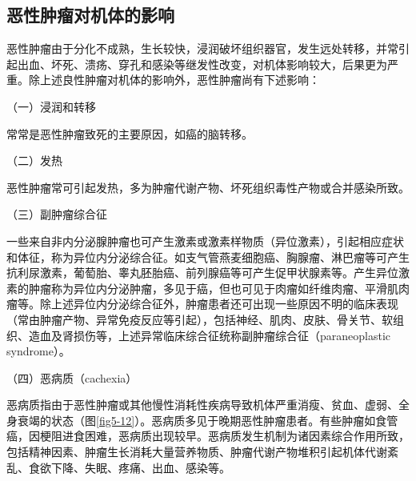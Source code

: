 \subsection{恶性肿瘤对机体的影响}

恶性肿瘤由于分化不成熟，生长较快，浸润破坏组织器官，发生远处转移，并常引起出血、坏死、溃疡、穿孔和感染等继发性改变，对机体影响较大，后果更为严重。除上述良性肿瘤对机体的影响外，恶性肿瘤尚有下述影响：

{（一）浸润和转移}

常常是恶性肿瘤致死的主要原因，如癌的脑转移。

{（二）发热}

恶性肿瘤常可引起发热，多为肿瘤代谢产物、坏死组织毒性产物或合并感染所致。

{（三）副肿瘤综合征}

一些来自非内分泌腺肿瘤也可产生激素或激素样物质（异位激素），引起相应症状和体征，称为异位内分泌综合征。如支气管燕麦细胞癌、胸腺瘤、淋巴瘤等可产生抗利尿激素，葡萄胎、睾丸胚胎癌、前列腺癌等可产生促甲状腺素等。产生异位激素的肿瘤称为异位内分泌肿瘤，多见于癌，但也可见于肉瘤如纤维肉瘤、平滑肌肉瘤等。除上述异位内分泌综合征外，肿瘤患者还可出现一些原因不明的临床表现（常由肿瘤产物、异常免疫反应等引起），包括神经、肌肉、皮肤、骨关节、软组织、造血及肾损伤等，上述异常临床综合征统称副肿瘤综合征（paraneoplastic
syndrome）。

{（四）恶病质（cachexia）}

恶病质指由于恶性肿瘤或其他慢性消耗性疾病导致机体严重消瘦、贫血、虚弱、全身衰竭的状态（图\ref{fig5-12}）。恶病质多见于晚期恶性肿瘤患者。有些肿瘤如食管癌，因梗阻进食困难，恶病质出现较早。恶病质发生机制为诸因素综合作用所致，包括精神因素、肿瘤生长消耗大量营养物质、肿瘤代谢产物堆积引起机体代谢紊乱、食欲下降、失眠、疼痛、出血、感染等。

